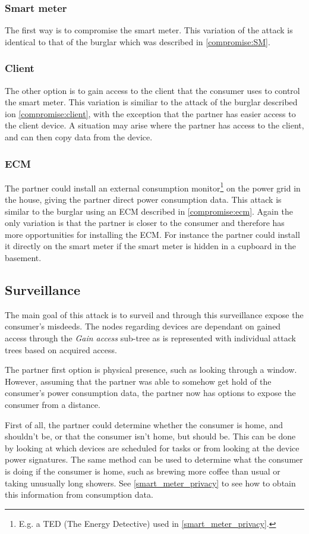 \subsubsection{Smart meter}
The first way is to compromise the smart meter.
This variation of the attack is identical to that of the burglar which was described in \cref{compromise:SM}.

\subsubsection{Client}
The other option is to gain access to the client that the consumer uses to control the smart meter.
This variation is similiar to the attack of the burglar described ion \cref{compromise:client}, with the exception that the partner has easier access to the client device.
A situation may arise where the partner has access to the client, and can then copy data from the device.

\subsubsection{ECM}
The partner could install an external consumption monitor\footnote{E.g. a TED (The Energy Detective) used in \cref {smart_meter_privacy}.} on the power grid in the house, giving the partner direct power consumption data.
This attack is similar to the burglar using an ECM described in \cref{compromise:ecm}.
Again the only variation is that the partner is closer to the consumer and therefore has more opportunities for installing the ECM.
For instance the partner could install it directly on the smart meter if the smart meter is hidden in a cupboard in the basement.

\subsection{Surveillance}
The main goal of this attack is to surveil and through this surveillance expose the consumer's misdeeds.
The nodes regarding devices are dependant on gained access through the \textit{Gain access} sub-tree as is represented with individual attack trees based on acquired access.

The partner first option is physical presence, such as looking through a window.
However, assuming that the partner was able to somehow get hold of the consumer's power consumption data, the partner now has options to expose the consumer from a distance.

First of all, the partner could determine whether the consumer is home, and shouldn't be, or that the consumer isn't home, but should be.
This can be done by looking at which devices are scheduled for tasks or from looking at the device power signatures.
The same method can be used to determine what the consumer is doing if the consumer is home, such as brewing more coffee than usual or taking unusually long showers.
See \cref{smart_meter_privacy} to see how to obtain this information from consumption data.

